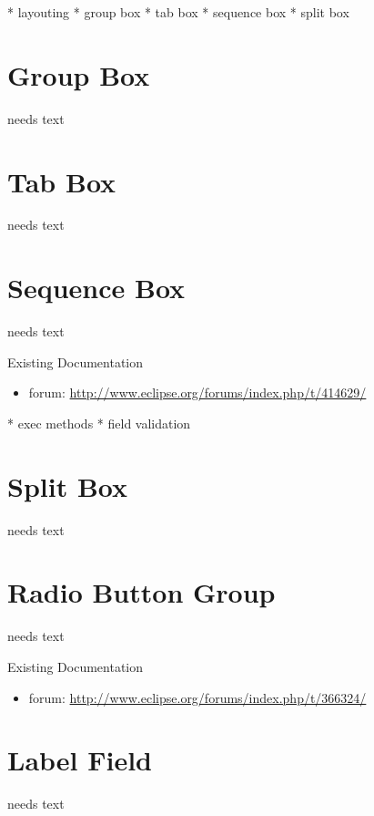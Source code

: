 \documentclass[a4paper,10pt,twoside]{book}
\begin{document}
* layouting
* group box
* tab box
* sequence box 
* split box

\section{Group Box}
needs text

\section{Tab Box}
needs text

\section{Sequence Box}
needs text

\noindent Existing Documentation
\begin{itemize}
  \item forum: \url{http://www.eclipse.org/forums/index.php/t/414629/}
\end{itemize}

* exec methods
* field validation


\section{Split Box}
needs text

\section{Radio Button Group}
needs text

\noindent Existing Documentation
\begin{itemize}
  \item forum: \url{http://www.eclipse.org/forums/index.php/t/366324/}
\end{itemize}

\section{Label Field}
needs text
	
\end{document}
